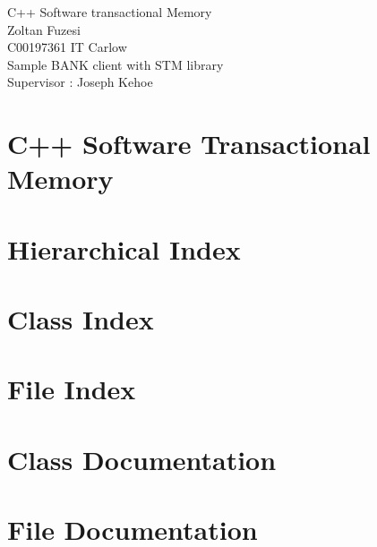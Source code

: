 \documentclass[twoside]{article}
\newcommand{\+}{\discretionary{\mbox{\scriptsize$\hookleftarrow$}}{}{}}
\newcommand{\clearemptydoublepage}{%
  \newpage{\pagestyle{empty}\cleardoublepage}%
}
\begin{document}
\hypersetup{pageanchor=false,
             bookmarksnumbered=true,
             pdfencoding=unicode
            }
\begin{titlepage}
\vspace*{7cm}
\begin{center}%
{\Large C++ Software transactional Memory }\\
\vspace*{1cm}
{\small Zoltan Fuzesi}\\
\vspace*{0.5cm}
{\small C00197361 IT Carlow}\\
\vspace*{0.5cm}
{\small Sample BANK client with STM library}\\
\vspace*{1.5cm}
{\small Supervisor : Joseph Kehoe}\\
\end{center}
\end{titlepage}
\tableofcontents
{}
\hypersetup{pageanchor=true}

\newpage
\section{C++ Software Transactional Memory}
\label{index}\hypertarget{index}{}
\newpage
\section{Hierarchical Index}

\section{Class Index}

\section{File Index}

\section{Class Documentation}






\section{File Documentation}




























\newpage
{}
\clearemptydoublepage
{}
\printindex
\end{document}
